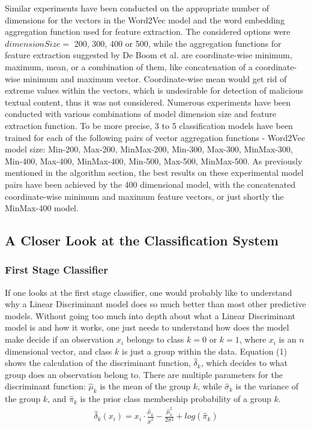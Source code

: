 \documentclass[11pt]{article}
\begin{document}
Similar experiments have been conducted on the appropriate number of dimensions for the vectors in the Word2Vec model and the word embedding aggregation function used for feature extraction. The considered options were $dimensionSize =$ 200, 300, 400 or 500, while the aggregation functions for feature extraction suggested by De Boom et al. are coordinate-wise minimum, maximum, mean, or a combination of them, like concatenation of a coordinate-wise minimum and maximum vector. Coordinate-wise mean would get rid of extreme values within the vectors, which is undesirable for detection of malicious textual content, thus it was not considered. Numerous experiments have been conducted with various combinations of model dimension size and feature extraction function. To be more precise, 3 to 5 classification models have been trained for each of the following pairs of vector aggregation functions - Word2Vec model size: Min-200, Max-200, MinMax-200, Min-300, Max-300, MinMax-300, Min-400, Max-400, MinMax-400, Min-500, Max-500, MinMax-500. As previously mentioned in the algorithm section, the best results on these experimental model pairs have been achieved by the 400 dimensional model, with the concatenated coordinate-wise minimum and maximum feature vectors, or just shortly the MinMax-400 model.

\subsection{A Closer Look at the Classification System}
\subsubsection{First Stage Classifier}
If one looks at the first stage classifier, one would probably like to understand why a Linear Discriminant model does so much better than most other predictive models. Without going too much into depth about what a Linear Discriminant model is and how it works, one just needs to understand how does the model make decide if an observation $x_i$ belongs to class $k=0 $ or $k=1$, where $x_i$ is an $n$ dimensional vector, and class $k$ is just a group within the data. Equation (1) \cite{tibshirani2013introduction} shows the calculation of the discriminant function, $\hat{\delta}_{k}$, which decides to what group does an observation belong to. There are multiple parameters for the discriminant function: $\hat{\mu }_{k}$ is the mean of the group $k$, while $\hat{\sigma}_{k}$ is the variance of the group $k$, and $\hat{\pi}_{k}$ is the prior class membership probability of a group $k$.
\begin{align}
	{{\hat{\delta }}}_{{k}}\left({x_i}\right)=x_i \cdot \frac {{{\hat{\mu }}}_{{k}}}{{{\hat{\sigma }}}^{{2}}}-\frac {{{\hat{\mu}}}_{{k}}^{{2}}}{2{\sigma }^{{2}}}+{log{\left({{{\hat{\pi }}}_{{k}}}\right)}} 
\end{align}
\end{document}

